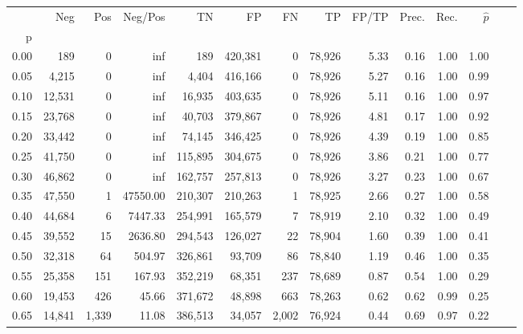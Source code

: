 \begin{tabular}{rrrrrrrrrrrrrr}
\toprule
{} &     Neg &     Pos &   Neg/Pos &       TN &       FP &      FN &      TP & FP/TP & Prec. &  Rec. & $\hat{p}$ \\
p    &         &         &           &          &          &         &         &       &       &       &           \\
\midrule
0.00 &     189 &       0 &       inf &      189 &  420,381 &       0 &  78,926 &  5.33 &  0.16 &  1.00 &      1.00 \\
0.05 &   4,215 &       0 &       inf &    4,404 &  416,166 &       0 &  78,926 &  5.27 &  0.16 &  1.00 &      0.99 \\
0.10 &  12,531 &       0 &       inf &   16,935 &  403,635 &       0 &  78,926 &  5.11 &  0.16 &  1.00 &      0.97 \\
0.15 &  23,768 &       0 &       inf &   40,703 &  379,867 &       0 &  78,926 &  4.81 &  0.17 &  1.00 &      0.92 \\
0.20 &  33,442 &       0 &       inf &   74,145 &  346,425 &       0 &  78,926 &  4.39 &  0.19 &  1.00 &      0.85 \\
0.25 &  41,750 &       0 &       inf &  115,895 &  304,675 &       0 &  78,926 &  3.86 &  0.21 &  1.00 &      0.77 \\
0.30 &  46,862 &       0 &       inf &  162,757 &  257,813 &       0 &  78,926 &  3.27 &  0.23 &  1.00 &      0.67 \\
0.35 &  47,550 &       1 &  47550.00 &  210,307 &  210,263 &       1 &  78,925 &  2.66 &  0.27 &  1.00 &      0.58 \\
0.40 &  44,684 &       6 &   7447.33 &  254,991 &  165,579 &       7 &  78,919 &  2.10 &  0.32 &  1.00 &      0.49 \\
0.45 &  39,552 &      15 &   2636.80 &  294,543 &  126,027 &      22 &  78,904 &  1.60 &  0.39 &  1.00 &      0.41 \\
0.50 &  32,318 &      64 &    504.97 &  326,861 &   93,709 &      86 &  78,840 &  1.19 &  0.46 &  1.00 &      0.35 \\
0.55 &  25,358 &     151 &    167.93 &  352,219 &   68,351 &     237 &  78,689 &  0.87 &  0.54 &  1.00 &      0.29 \\
0.60 &  19,453 &     426 &     45.66 &  371,672 &   48,898 &     663 &  78,263 &  0.62 &  0.62 &  0.99 &      0.25 \\
0.65 &  14,841 &   1,339 &     11.08 &  386,513 &   34,057 &   2,002 &  76,924 &  0.44 &  0.69 &  0.97 &      0.22 \\

\end{tabular}

